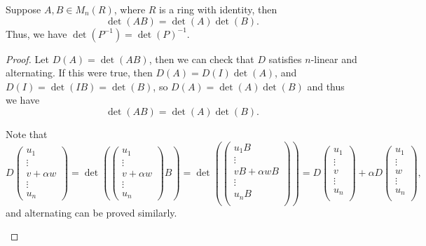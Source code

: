 \begin{theorem}
    Suppose \(A, B \in M_n(R)\), where \(R\) is a ring with identity, then 
    \[
        \det (AB) = \det (A) \det (B).
    \] Thus, we have \(\det (P^{-1}) = \det (P)^{-1}\). 
\end{theorem}
\begin{proof}
    Let \(D(A) = \det (AB)\), then we can check that \(D\) satisfies \(n\)-linear and alternating. If this were true, then \(D(A) = D(I) \det (A)\), and \(D(I) = \det (IB) = \det (B)\), so \(D(A) = \det (A) \det (B)\) and thus we have 
    \[
        \det (AB) = \det (A) \det (B).
    \]    
    \begin{note}
        Note that 
        \[
            D \begin{pmatrix}
                 u_1 \\
                 \vdots \\
                 v + \alpha w \\
                 \vdots \\
                 u_n
            \end{pmatrix} = \det \left( \begin{pmatrix}
                 u_1 \\
                 \vdots \\
                 v + \alpha w \\
                 \vdots \\
                 u_n
            \end{pmatrix} B \right) = \det \left( \begin{pmatrix}
                 u_1 B  \\
                 \vdots \\
                 vB + \alpha w B \\
                 \vdots \\
                 u_n B \\
            \end{pmatrix} \right) = D \begin{pmatrix}
                 u_1 \\
                 \vdots \\
                 v \\
                 \vdots \\
                 u_n \\
            \end{pmatrix} + \alpha D \begin{pmatrix}
                 u_1 \\
                 \vdots \\
                 w \\
                 \vdots \\
                 u_n \\
            \end{pmatrix},
        \] and alternating can be proved similarly.
    \end{note}
\end{proof}

